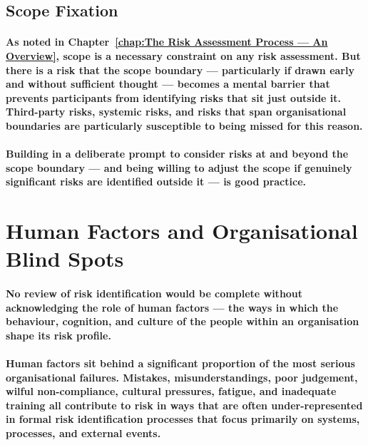 \subsection{Scope Fixation}
\paragraph{As noted in Chapter~\ref{chap:The Risk Assessment Process — An Overview}, scope is a necessary constraint on any risk assessment. But there is a risk that the scope boundary — particularly if drawn early and without sufficient thought — becomes a mental barrier that prevents participants from identifying risks that sit just outside it. Third-party risks, systemic risks, and risks that span organisational boundaries are particularly susceptible to being missed for this reason.}
\paragraph{Building in a deliberate prompt to consider risks at and beyond the scope boundary — and being willing to adjust the scope if genuinely significant risks are identified outside it — is good practice.}

\section{Human Factors and Organisational Blind Spots}
\paragraph{No review of risk identification would be complete without acknowledging the role of human factors — the ways in which the behaviour, cognition, and culture of the people within an organisation shape its risk profile.}
\paragraph{Human factors sit behind a significant proportion of the most serious organisational failures. Mistakes, misunderstandings, poor judgement, wilful non-compliance, cultural pressures, fatigue, and inadequate training all contribute to risk in ways that are often under-represented in formal risk identification processes that focus primarily on systems, processes, and external events.}
